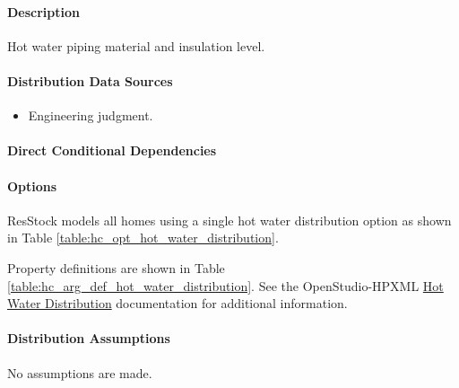 \paragraph{Description}
% 
Hot water piping material and insulation level.

\paragraph{Distribution Data Sources}
% 
\begin{itemize}
\item
  Engineering judgment.
\end{itemize}

\paragraph{Direct Conditional Dependencies}


\paragraph{Options}
ResStock models all homes using a single hot water distribution option as shown in Table \ref{table:hc_opt_hot_water_distribution}.



Property definitions are shown in Table \ref{table:hc_arg_def_hot_water_distribution}. See the OpenStudio-HPXML \href{https://openstudio-hpxml.readthedocs.io/en/v1.10.0/workflow_inputs.html#hpxml-hot-water-distribution}{Hot Water Distribution} documentation for additional information.



\paragraph{Distribution Assumptions}
% 
No assumptions are made.

